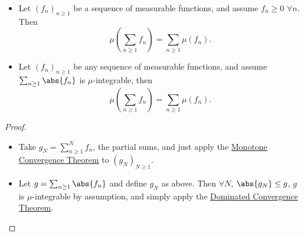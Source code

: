 \documentclass{article}
\newcommand{\1}[1]{\mathbbm{1}_{#1}}
\begin{document}
\begin{cor}
    \leavevmode
    \begin{itemize}
        \item Let $(f_n)_{n \geq 1}$ be a sequence of measurable functions, and assume $f_n \geq 0$ $\forall n$. Then
            \begin{equation*}
                \mu\left(\sum_{n \geq 1} f_n\right) = \sum_{n \geq 1} \mu(f_n).
            \end{equation*}

        \item Let $(f_n)_{n \geq 1}$ be any sequence of measurable functions, and assume $\sum_{n \geq 1} \abs{f_n}$ is $\mu$-integrable, then
            \begin{equation*}
                \mu\left(\sum_{n \geq 1} f_n\right) = \sum_{n \geq 1} \mu(f_n).
            \end{equation*}
    \end{itemize}
\end{cor}

\begin{proof}
    \leavevmode
    \begin{itemize}
        \item Take $g_N = \sum_{n \geq 1}^N f_n$, the partial sums, and just apply the \hyperlink{def:monConv}{Monotone Convergence Theorem} to $(g_N)_{N \geq 1}$.
        \item Let $g = \sum_{n \geq 1} \abs{f_n}$ and define $g_N$ as above.
            Then $\forall N$, $\abs{g_N} \leq g$, $g$ is $\mu$-integrable by assumption, and simply apply the \hyperlink{thm:dct}{Dominated Convergence Theorem}. \qedhere
    \end{itemize}
\end{proof}
\end{document}

